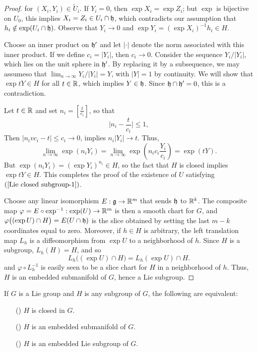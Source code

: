 \begin{proof}
for $(X_i,Y_i)\in\widetilde{U}_i$. If $Y_i=0$, then $\exp X_i=\exp Z_i$; but $\exp$ is bijective on $U_0$, this implies $X_i=Z_i\in U_i\cap\mathfrak{h}$, which
contradicts our assumption that $h_i\notin\exp(U_i\cap\mathfrak{h})$. Observe that $Y_i\to 0$ and $\exp Y_i=(\exp X_i)^{-1}h_i\in H$.\par
Choose an inner product on $\mathfrak{h}'$ and let $|\cdot|$ denote the norm associated with this inner product. If we define $c_i=|Y_i|$, then $c_i\to 0$. Consider the sequence $Y_i/|Y_i|$, which lies on the unit sphere in $\mathfrak{h}'$. By replacing it by a subsequence, we may assumeso that $\lim_{n\to\infty}Y_i/|Y_i|=Y$, with $|Y|=1$ by continuity. We will show that $\exp tY\in H$ for all $t\in\mathbb{R}$, which implies $Y\in\mathfrak{h}$. Since $\mathfrak{h}\cap\mathfrak{h}'=0$, this is a contradiction.\par
Let $t\in\mathbb{R}$ and set $n_i=[\frac{t}{c_i}]$, so that
\[\Big|n_i-\frac{t}{c_i}\Big|\leq 1,\]
Then $|n_ivc_i-t|\leq c_i\to 0$, implies $n_i|Y_i|\to t$. Thus,
\[\lim_{n\to\infty}\exp(n_iY_i)=\lim_{n\to\infty}\exp(n_ic_i\frac{Y_i}{c_i})=\exp(tY).\]
But $\exp(n_iY_i)=(\exp Y_i)^{n_i}\in H$, so the fact that $H$ is closed implies $\exp tY\in H$. This completes the proof of the existence of $U$ satisfying $(\ref{Lie closed subgroup-1})$.\par
Choose any linear isomorphism $E:\mathfrak{g}\to\mathbb{R}^m$ that sends $\mathfrak{h}$ to $\mathbb{R}^k$. The composite
map $\varphi=E\circ\exp^{-1}:\exp(U)\to\mathbb{R}^m$ is then a smooth chart for $G$, and $\varphi\big((\exp U)\cap H\big)=E(U\cap\mathfrak{h})$ is the slice obtained by setting the last $m-k$ coordinates equal to zero. Moreover, if $h\in H$ is arbitrary, the left translation map $L_h$ is a diffeomorphism from $\exp U$ to a neighborhood of $h$. Since $H$ is a subgroup, $L_h(H)=H$, and so
\[L_h\big((\exp U)\cap H\big)=L_h(\exp U)\cap H.\]
and $\varphi\circ L_h^{-1}$ is easily seen to be a slice chart for $H$ in a neighborhood of $h$. Thus, $H$ is an embedded submanifold of $G$, hence a Lie subgroup.
\end{proof}
\begin{corollary}
If $G$ is a Lie group and $H$ is any subgroup of $G$, the following are equivalent:
\begin{itemize}
\item[(\rmnum{1})] $H$ is closed in $G$.
\item[(\rmnum{2})] $H$ is an embedded submanifold of $G$.
\item[(\rmnum{3})] $H$ is an embedded Lie subgroup of $G$.
\end{itemize}
\end{corollary}
